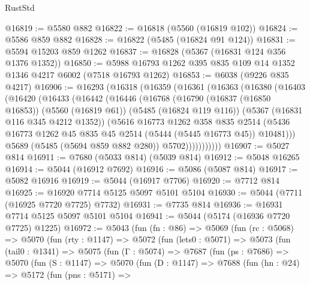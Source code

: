 \begin{lexlean}{RustStd}
\begin{coremodule}
@16819 := @5580 @882
@16822 := @16818 (@5560 (@16819 @102))
@16824 := @5586 @859 @882
@16828 := @16822 (@5485 (@16824 @91 @124))
@16831 := @5594 @15203 @859 @1262
@16837 := @16828 (@5367 (@16831 @124 @356 @1376 @1352))
@16850 := @5988 @16793 @1262 @395 @835 @109 @14 @1352 @1346 @4217 @6002 (@7518 @16793 @1262)
@16853 := @6038 (@9226 @835 @4217)
@16906 := @16293
    (@16318
      (@16359
        (@16361
          (@16363
            (@16380
              (@16403
                (@16420
                  (@16433
                    (@16442
                      (@16446
                        (@16768
                          (@16790
                            (@16837 (@16850 @16853))
                            (@5560 (@16819 @61))
                            (@5485 (@16824 @119 @116))
                            (@5367 (@16831 @116 @345 @4212 @1352))
                            (@5616
                              @16773
                              @1262
                              @358
                              @835
                              @2514
                              (@5436
                                @16773
                                @1262
                                @45
                                @835
                                @45
                                @2514
                                (@5444 (@5445 @16773 @45))
                                @10481)))
                          @5689
                          (@5485 (@5694 @859 @882 @280))
                          @5702)))))))))))
@16907 := @5027 @814
@16911 := @7680 (@5033 @814) (@5039 @814)
@16912 := @5048 @16265
@16914 := @5044 (@16912 @7692)
@16916 := @5086 (@5087 @814)
@16917 := @5082 @16916
@16919 := @5044 (@16917 @7706)
@16920 := @7712 @814
@16925 := @16920 @7714 @5125 @5097 @5101 @5104
@16930 := @5044 (@7711 (@16925 @7720 @7725) @7732)
@16931 := @7735 @814
@16936 := @16931 @7714 @5125 @5097 @5101 @5104
@16941 := @5044 (@5174 (@16936 @7720 @7725) @1225)
@16972 := @5043
    (fun (fn : @86) =>
    @5069
      (fun (rc : @5068) =>
      @5070
        (fun (rty : @1147) =>
        @5072
          (fun (lets0 : @5071) =>
          @5073
            (fun (tail0 : @1341) =>
            @5075
              (fun (Γ : @5074) =>
              @7687
                (fun (ps : @7686) =>
                @5070
                  (fun (S : @1147) =>
                  @5070
                    (fun (D : @1147) =>
                    @7688
                      (fun (hn : @24) =>
                      @5172
                        (fun (pns : @5171) =>

\end{coremodule}
\end{lexlean}
